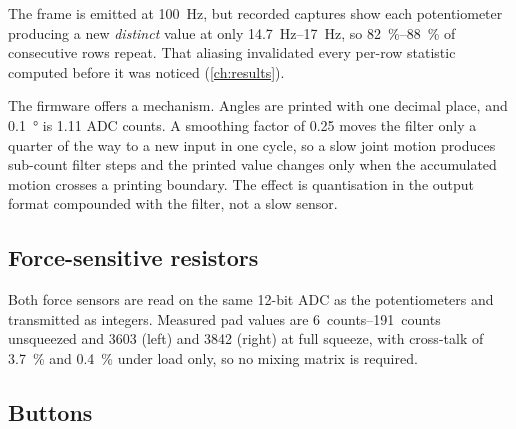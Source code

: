 The frame is emitted at \SI{100}{\hertz}, but recorded captures show each
potentiometer producing a new \emph{distinct} value at only
\SIrange{14.7}{17}{\hertz}, so \SIrange{82}{88}{\percent} of consecutive rows
repeat. That aliasing invalidated every per-row statistic computed before it
was noticed (\cref{ch:results}).

The firmware offers a mechanism. Angles are printed with one decimal place,
and \SI{0.1}{\degree} is \num{1.11} ADC counts. A smoothing factor of
\num{0.25} moves the filter only a quarter of the way to a new input in one
cycle, so a slow joint motion produces sub-count filter steps and the printed
value changes only when the accumulated motion crosses a printing boundary.
The effect is quantisation in the output format compounded with the filter,
not a slow sensor.


\subsection{Force-sensitive resistors}

Both force sensors are read on the same 12-bit ADC as the potentiometers and
transmitted as integers. Measured pad values are \SIrange{6}{191}{counts}
unsqueezed and \num{3603} (left) and \num{3842} (right) at full squeeze, with
cross-talk of \SI{3.7}{\percent} and \SI{0.4}{\percent} under load only, so no
mixing matrix is required.


\subsection{Buttons}

